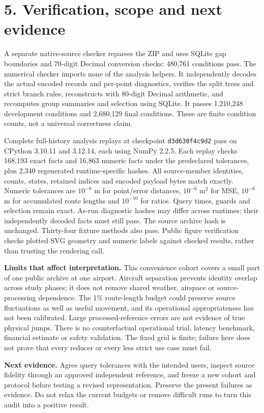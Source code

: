 \documentclass[11pt]{article}
\newcommand{\DevChecks}{1,210,248}
\newcommand{\FinalChecks}{2,680,129}
\newcommand{\NativeChecks}{480,761}
\begin{document}
\clearpage
\section*{5. Verification, scope and next evidence}
A separate native-source checker reparses the ZIP and uses SQLite gap boundaries and 70-digit Decimal conversion checks: \NativeChecks{} conditions pass. The numerical checker imports none of the analysis helpers. It independently decodes the actual encoded records and per-point diagnostics, verifies the split trees and strict branch rules, reconstructs with 80-digit Decimal arithmetic, and recomputes group summaries and selection using SQLite. It passes \DevChecks{} development conditions and \FinalChecks{} final conditions. These are finite condition counts, not a universal correctness claim.

Complete full-history analysis replays at checkpoint \texttt{d3d630f4c9d2} pass on CPython 3.10.11 and 3.12.14, each using NumPy 2.2.5. Each replay checks 168,193 exact facts and 16,863 numeric facts under the predeclared tolerances, plus 2,340 regenerated runtime-specific hashes. All source-member identities, counts, states, retained indices and encoded payload bytes match exactly. Numeric tolerances are $10^{-8}$ m for point/error distances, $10^{-6}$ m$^2$ for MSE, $10^{-6}$ m for accumulated route lengths and $10^{-10}$ for ratios. Query times, guards and selection remain exact. As-run diagnostic hashes may differ across runtimes; their independently decoded facts must still pass. The source archive hash is unchanged. Thirty-four fixture methods also pass. Public figure verification checks plotted SVG geometry and numeric labels against checked results, rather than trusting the rendering call.

\textbf{Limits that affect interpretation.} This convenience cohort covers a small part of one public archive at one airport. Aircraft separation prevents identity overlap across study phases; it does not remove shared weather, airspace or source-processing dependence. The 1\% route-length budget could preserve source fluctuations as well as useful movement, and its operational appropriateness has not been calibrated. Large processed-reference errors are not evidence of true physical jumps. There is no counterfactual operational trial, latency benchmark, financial estimate or safety validation. The fixed grid is finite; failure here does not prove that every reducer or every less strict use case must fail.

\textbf{Next evidence.} Agree query tolerances with the intended users, inspect source fidelity through an approved independent reference, and freeze a new cohort and protocol before testing a revised representation. Preserve the present failures as evidence. Do not relax the current budgets or remove difficult runs to turn this audit into a positive result.
\end{document}
